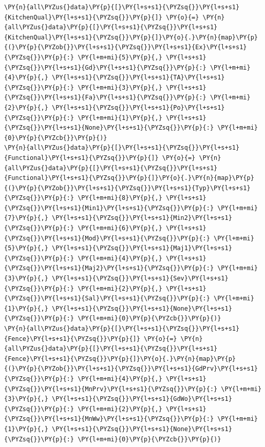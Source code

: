 \documentclass[no-math]{YangThesis}
\begin{document}
\begin{tcolorbox}[breakable, size=fbox, boxrule=1pt, pad at break*=1mm,colback=cellbackground, colframe=cellborder]
\begin{Verbatim}[commandchars=\\\{\}]
\PY{n}{all\PYZus{}data}\PY{p}{[}\PY{l+s+s1}{\PYZsq{}}\PY{l+s+s1}{KitchenQual}\PY{l+s+s1}{\PYZsq{}}\PY{p}{]} \PY{o}{=} \PY{n}{all\PYZus{}data}\PY{p}{[}\PY{l+s+s1}{\PYZsq{}}\PY{l+s+s1}{KitchenQual}\PY{l+s+s1}{\PYZsq{}}\PY{p}{]}\PY{o}{.}\PY{n}{map}\PY{p}{(}\PY{p}{\PYZob{}}\PY{l+s+s1}{\PYZsq{}}\PY{l+s+s1}{Ex}\PY{l+s+s1}{\PYZsq{}}\PY{p}{:} \PY{l+m+mi}{5}\PY{p}{,} \PY{l+s+s1}{\PYZsq{}}\PY{l+s+s1}{Gd}\PY{l+s+s1}{\PYZsq{}}\PY{p}{:} \PY{l+m+mi}{4}\PY{p}{,} \PY{l+s+s1}{\PYZsq{}}\PY{l+s+s1}{TA}\PY{l+s+s1}{\PYZsq{}}\PY{p}{:} \PY{l+m+mi}{3}\PY{p}{,} \PY{l+s+s1}{\PYZsq{}}\PY{l+s+s1}{Fa}\PY{l+s+s1}{\PYZsq{}}\PY{p}{:} \PY{l+m+mi}{2}\PY{p}{,} \PY{l+s+s1}{\PYZsq{}}\PY{l+s+s1}{Po}\PY{l+s+s1}{\PYZsq{}}\PY{p}{:} \PY{l+m+mi}{1}\PY{p}{,} \PY{l+s+s1}{\PYZsq{}}\PY{l+s+s1}{None}\PY{l+s+s1}{\PYZsq{}}\PY{p}{:} \PY{l+m+mi}{0}\PY{p}{\PYZcb{}}\PY{p}{)}
\PY{n}{all\PYZus{}data}\PY{p}{[}\PY{l+s+s1}{\PYZsq{}}\PY{l+s+s1}{Functional}\PY{l+s+s1}{\PYZsq{}}\PY{p}{]} \PY{o}{=} \PY{n}{all\PYZus{}data}\PY{p}{[}\PY{l+s+s1}{\PYZsq{}}\PY{l+s+s1}{Functional}\PY{l+s+s1}{\PYZsq{}}\PY{p}{]}\PY{o}{.}\PY{n}{map}\PY{p}{(}\PY{p}{\PYZob{}}\PY{l+s+s1}{\PYZsq{}}\PY{l+s+s1}{Typ}\PY{l+s+s1}{\PYZsq{}}\PY{p}{:} \PY{l+m+mi}{8}\PY{p}{,} \PY{l+s+s1}{\PYZsq{}}\PY{l+s+s1}{Min1}\PY{l+s+s1}{\PYZsq{}}\PY{p}{:} \PY{l+m+mi}{7}\PY{p}{,} \PY{l+s+s1}{\PYZsq{}}\PY{l+s+s1}{Min2}\PY{l+s+s1}{\PYZsq{}}\PY{p}{:} \PY{l+m+mi}{6}\PY{p}{,} \PY{l+s+s1}{\PYZsq{}}\PY{l+s+s1}{Mod}\PY{l+s+s1}{\PYZsq{}}\PY{p}{:} \PY{l+m+mi}{5}\PY{p}{,} \PY{l+s+s1}{\PYZsq{}}\PY{l+s+s1}{Maj1}\PY{l+s+s1}{\PYZsq{}}\PY{p}{:} \PY{l+m+mi}{4}\PY{p}{,} \PY{l+s+s1}{\PYZsq{}}\PY{l+s+s1}{Maj2}\PY{l+s+s1}{\PYZsq{}}\PY{p}{:} \PY{l+m+mi}{3}\PY{p}{,} \PY{l+s+s1}{\PYZsq{}}\PY{l+s+s1}{Sev}\PY{l+s+s1}{\PYZsq{}}\PY{p}{:} \PY{l+m+mi}{2}\PY{p}{,} \PY{l+s+s1}{\PYZsq{}}\PY{l+s+s1}{Sal}\PY{l+s+s1}{\PYZsq{}}\PY{p}{:} \PY{l+m+mi}{1}\PY{p}{,} \PY{l+s+s1}{\PYZsq{}}\PY{l+s+s1}{None}\PY{l+s+s1}{\PYZsq{}}\PY{p}{:} \PY{l+m+mi}{0}\PY{p}{\PYZcb{}}\PY{p}{)}
\PY{n}{all\PYZus{}data}\PY{p}{[}\PY{l+s+s1}{\PYZsq{}}\PY{l+s+s1}{Fence}\PY{l+s+s1}{\PYZsq{}}\PY{p}{]} \PY{o}{=} \PY{n}{all\PYZus{}data}\PY{p}{[}\PY{l+s+s1}{\PYZsq{}}\PY{l+s+s1}{Fence}\PY{l+s+s1}{\PYZsq{}}\PY{p}{]}\PY{o}{.}\PY{n}{map}\PY{p}{(}\PY{p}{\PYZob{}}\PY{l+s+s1}{\PYZsq{}}\PY{l+s+s1}{GdPrv}\PY{l+s+s1}{\PYZsq{}}\PY{p}{:} \PY{l+m+mi}{4}\PY{p}{,} \PY{l+s+s1}{\PYZsq{}}\PY{l+s+s1}{MnPrv}\PY{l+s+s1}{\PYZsq{}}\PY{p}{:} \PY{l+m+mi}{3}\PY{p}{,} \PY{l+s+s1}{\PYZsq{}}\PY{l+s+s1}{GdWo}\PY{l+s+s1}{\PYZsq{}}\PY{p}{:} \PY{l+m+mi}{2}\PY{p}{,} \PY{l+s+s1}{\PYZsq{}}\PY{l+s+s1}{MnWw}\PY{l+s+s1}{\PYZsq{}}\PY{p}{:} \PY{l+m+mi}{1}\PY{p}{,} \PY{l+s+s1}{\PYZsq{}}\PY{l+s+s1}{None}\PY{l+s+s1}{\PYZsq{}}\PY{p}{:} \PY{l+m+mi}{0}\PY{p}{\PYZcb{}}\PY{p}{)}

\end{Verbatim}
\end{tcolorbox}
\end{document}
